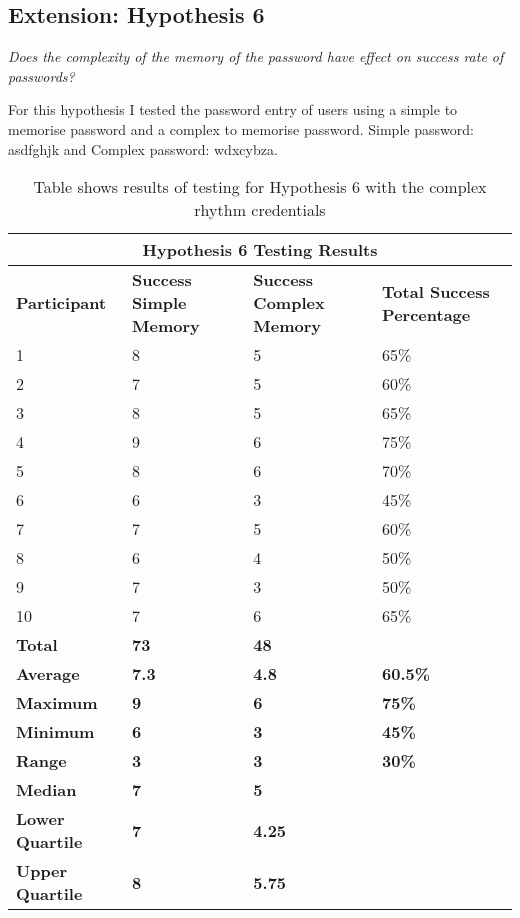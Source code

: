 \documentclass{article}
\begin{document}
\subsection{Extension: Hypothesis 6}
\begin{center}
\textit{Does the complexity of the memory of the password have effect on success rate of passwords?} \newline \\
\end{center}

For this hypothesis I tested the password entry of users using a simple to memorise password and a complex to memorise password. Simple password: asdfghjk and Complex password: wdxcybza. 


{
\begin{table} [H]
\centering
\begin{tabular}{ |p{2cm}|p{4cm}|p{4cm}| p{4cm} | }
\hline
\multicolumn{4}{|c|}{\textbf{Hypothesis 6 Testing Results}} \\
\hline
\textbf{Participant} & \textbf{Success Simple Memory} & \textbf{Success Complex Memory} & \textbf{Total Success Percentage} \\
\hline
1 & 8 & 5 & 65\% \\
\hline
2 & 7 & 5 & 60\% \\
\hline
3 & 8 & 5 & 65\% \\
\hline
4 & 9 & 6 & 75\%  \\
\hline
5 & 8 & 6 & 70\% \\
\hline
6 & 6 & 3 & 45\% \\
\hline
7 & 7 & 5 & 60\% \\
\hline
8 & 6 & 4 & 50\% \\
\hline
9 & 7 & 3 & 50\% \\
\hline
10 & 7 & 6 & 65\% \\
\hline
\textbf{Total} & \textbf{73} & \textbf{48} & \\
\hline
\textbf{Average} & \textbf{7.3} & \textbf{4.8} & \textbf{60.5\%} \\
\hline
\textbf{Maximum} & \textbf{9} & \textbf{6} & \textbf{75\%} \\
\hline
\textbf{Minimum} & \textbf{6} & \textbf{3} & \textbf{45\%} \\
\hline
\textbf{Range} & \textbf{3} & \textbf{3} & \textbf{30\%} \\
\hline
\textbf{Median} & \textbf{7} & \textbf{5} & \\
\hline
\textbf{Lower Quartile} & \textbf{7} & \textbf{4.25} & \\
\hline
\textbf{Upper Quartile} & \textbf{8} & \textbf{5.75} & \\
\hline
\end{tabular}
\caption{Table shows results of testing for Hypothesis 6 with the complex rhythm credentials}
\label{table:7}
\end{table}
}
\end{document}
